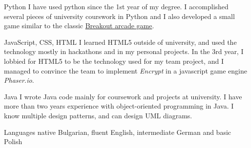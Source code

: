 \documentclass{tccv}
\begin{document}
\begin{skillist}

\item{Python} {I have used python since the 1st year of my degree. I accomplished several pieces of university courswork in Python and I also developed a small game similar to the classic \href{http://en.wikipedia.org/wiki/Breakout_(video_game)}{Breakout arcade game}.}

\item{JavaScript, CSS, HTML} {I learned HTML5 outside of university, and used the technology mostly in hackathons and in my personal projects. In the 3rd year, I lobbied for HTML5 to be the technology used for my team project, and I managed to convince the team to implement \textit{Encrypt} in a javascript game engine \textit{Phaser.io}.}

\item{Java}
{I wrote Java code mainly for coursework and projects at university. I have more than two years experience with object-oriented programming in Java. I know multiple design patterns, and can design UML diagrams.}
 
\item {Languages } {native Bulgarian, fluent English, intermediate German and basic Polish}
\end{skillist}
\end{document}
